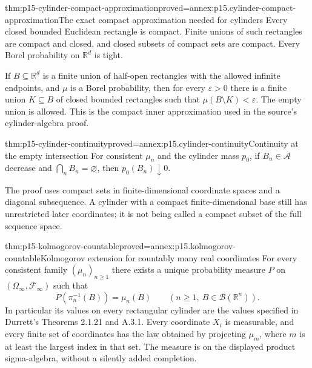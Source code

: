\begin{hblemma}{thm:p15-cylinder-compact-approximation}{proved=annex:p15.cylinder-compact-approximation}{The exact compact approximation needed for cylinders}
Every closed bounded Euclidean rectangle is compact. Finite unions
of such rectangles are compact and closed, and closed subsets of
compact sets are compact. Every Borel probability on \(\mathbb R^d\)
is tight.

If \(B\subseteq\mathbb R^d\) is a finite union of half-open
rectangles with the allowed infinite endpoints, and \(\mu\) is
a Borel probability, then for every \(\varepsilon>0\) there is
a finite union \(K\subseteq B\) of closed bounded rectangles
such that \(\mu(B\setminus K)<\varepsilon\). The empty union
is allowed. This is the compact inner approximation used in the
source's cylinder-algebra proof.
\end{hblemma}

\begin{hblemma}{thm:p15-cylinder-continuity}{proved=annex:p15.cylinder-continuity}{Continuity at the empty intersection}
For consistent \(\mu_n\) and the cylinder mass \(p_0\), if
\(B_n\in\mathcal A\) decrease and \(\bigcap_n B_n=\varnothing\),
then \(p_0(B_n)\downarrow0\).

The proof uses compact sets in finite-dimensional coordinate spaces
and a diagonal subsequence. A cylinder with a compact finite-dimensional
base still has unrestricted later coordinates; it is not being called
a compact subset of the full sequence space.
\end{hblemma}

\begin{hbtheorem}{thm:p15-kolmogorov-countable}{proved=annex:p15.kolmogorov-countable}{Kolmogorov extension for countably many real coordinates}
For every consistent family \((\mu_n)_{n\geq1}\) there exists
a unique probability measure \(P\) on
\((\Omega_\infty,\mathcal F_\infty)\) such that
\[
 P(\pi_n^{-1}(B))=\mu_n(B)
       \qquad(n\geq1,\ B\in\mathcal B(\mathbb R^n)).
\]
In particular its values on every rectangular cylinder are the values
specified in Durrett's Theorems 2.1.21 and A.3.1.
Every coordinate \(X_i\) is measurable, and every finite set of
coordinates has the law obtained by projecting \(\mu_m\), where
\(m\) is at least the largest index in that set. The measure is
on the displayed product sigma-algebra, without a silently added completion.
\end{hbtheorem}

